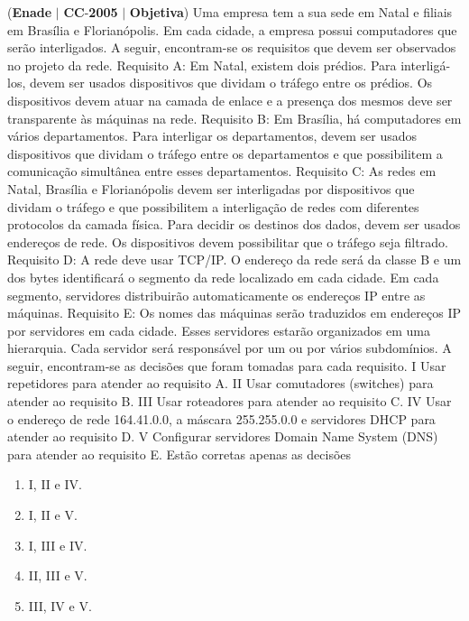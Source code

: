 \documentclass{exam}
\begin{document}
\begin{questions}
\question (\textbf{Enade} $|$ \textbf{CC}-\textbf{2005} $|$ \textbf{Objetiva})
Uma empresa tem a sua sede em Natal e filiais em Brasília e
Florianópolis. Em cada cidade, a empresa possui computadores que
serão interligados. A seguir, encontram-se os requisitos que devem
ser observados no projeto da rede.
Requisito A: Em Natal, existem dois prédios. Para interligá-los,
devem ser usados dispositivos que dividam o tráfego entre os prédios.
Os dispositivos devem atuar na camada de enlace e a presença dos
mesmos deve ser transparente às máquinas na rede.
Requisito B: Em Brasília, há computadores em vários departamentos.
Para interligar os departamentos, devem ser usados dispositivos que
dividam o tráfego entre os departamentos e que possibilitem a
comunicação simultânea entre esses departamentos.
Requisito C: As redes em Natal, Brasília e Florianópolis devem ser
interligadas por dispositivos que dividam o tráfego e que possibilitem
a interligação de redes com diferentes protocolos da camada física.
Para decidir os destinos dos dados, devem ser usados endereços de
rede. Os dispositivos devem possibilitar que o tráfego seja filtrado.
Requisito D: A rede deve usar TCP/IP. O endereço da rede será da
classe B e um dos bytes identificará o segmento da rede localizado em
cada cidade. Em cada segmento, servidores distribuirão
automaticamente os endereços IP entre as máquinas.
Requisito E: Os nomes das máquinas serão traduzidos em endereços
IP por servidores em cada cidade. Esses servidores estarão
organizados em uma hierarquia. Cada servidor será responsável por
um ou por vários subdomínios.
A seguir, encontram-se as decisões que foram tomadas para cada
requisito.
I Usar repetidores para atender ao requisito A.
II Usar comutadores (switches) para atender ao requisito B.
III Usar roteadores para atender ao requisito C.
IV Usar o endereço de rede 164.41.0.0, a máscara 255.255.0.0 e
servidores DHCP para atender ao requisito D.
V Configurar servidores Domain Name System (DNS) para
atender ao requisito E.
Estão corretas apenas as decisões
	\begin{enumerate}[label=\alph*)]
		\item  I, II e IV. 
		\item  I, II e V. 
		\item  I, III e IV.
		\item  II, III e V.
		\item  III, IV e V.
	\end{enumerate}


\end{questions}
\end{document}
